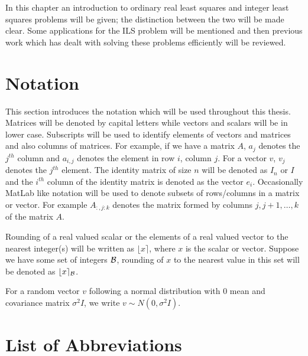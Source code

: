 \documentclass[12pt,Bold,letterpaper]{mcgilletdclass}
\begin{document}
In this chapter an introduction to ordinary real least squares and integer least squares problems will be given; the distinction between the two will be made clear. Some applications for the ILS problem will be mentioned and then previous work which has dealt with solving these problems efficiently will be reviewed. 

\section{Notation}

This section introduces the notation which will be used throughout this thesis. Matrices will be denoted by capital letters while vectors and scalars will be in lower case. Subscripts will be used to identify elements of vectors and matrices and also columns of matrices. For example, if we have a matrix $A$, $a_j$ denotes the $j^{th}$ column and $a_{i,j}$ denotes the element in row $i$, column $j$. For a vector $v$, $v_j$ denotes the $j^{th}$ element. The identity matrix of size $n$ will be denoted as $I_n$ or $I$ and the $i^{th}$ column of the identity matrix is denoted as the vector $e_i$. Occasionally MatLab like notation will be used to denote subsets of rows/columns in a matrix or vector. For example $A_{:,j:k}$ denotes the matrix formed by columns $j, j+1, \dots, k$ of the matrix $A$.

Rounding of a real valued scalar or the elements of a real valued vector to the nearest integer(s) will be written as $\lfloor x \rceil$, where $x$ is the scalar or vector. Suppose we have some set of integers ${\cal B}$, rounding of $x$ to the nearest value in this set will be denoted as  $\lfloor x \rceil_{{\cal B}}$.

For a random vector $v$ following a normal distribution with $0$ mean and covariance matrix $\sigma^2I$, we write $v \sim N(0,\sigma^2I)$.

\section{List of Abbreviations}
\end{document}
